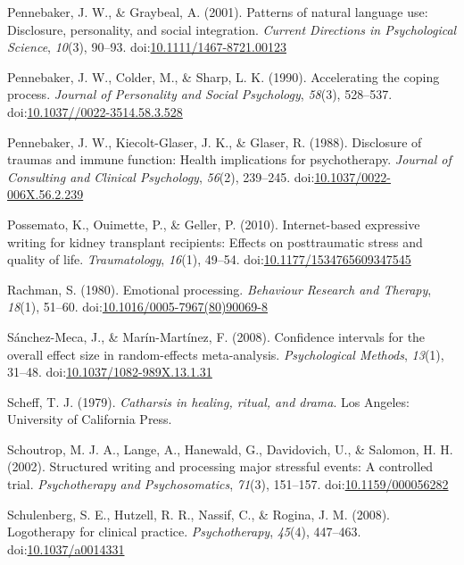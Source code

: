 \documentclass[english,man]{apa6}
\theoremstyle{definition}
\theoremstyle{definition}
\theoremstyle{definition}
\theoremstyle{remark}
\begin{document}
\hypertarget{ref-Pennebaker2001}{}
Pennebaker, J. W., \& Graybeal, A. (2001). Patterns of natural language
use: Disclosure, personality, and social integration. \emph{Current
Directions in Psychological Science}, \emph{10}(3), 90--93.
doi:\href{https://doi.org/10.1111/1467-8721.00123}{10.1111/1467-8721.00123}

\hypertarget{ref-Pennebaker1990}{}
Pennebaker, J. W., Colder, M., \& Sharp, L. K. (1990). Accelerating the
coping process. \emph{Journal of Personality and Social Psychology},
\emph{58}(3), 528--537.
doi:\href{https://doi.org/10.1037//0022-3514.58.3.528}{10.1037//0022-3514.58.3.528}

\hypertarget{ref-Pennebaker1988}{}
Pennebaker, J. W., Kiecolt-Glaser, J. K., \& Glaser, R. (1988).
Disclosure of traumas and immune function: Health implications for
psychotherapy. \emph{Journal of Consulting and Clinical Psychology},
\emph{56}(2), 239--245.
doi:\href{https://doi.org/10.1037/0022-006X.56.2.239}{10.1037/0022-006X.56.2.239}

\hypertarget{ref-Possemato2010}{}
Possemato, K., Ouimette, P., \& Geller, P. (2010). Internet-based
expressive writing for kidney transplant recipients: Effects on
posttraumatic stress and quality of life. \emph{Traumatology},
\emph{16}(1), 49--54.
doi:\href{https://doi.org/10.1177/1534765609347545}{10.1177/1534765609347545}

\hypertarget{ref-Rachman1980}{}
Rachman, S. (1980). Emotional processing. \emph{Behaviour Research and
Therapy}, \emph{18}(1), 51--60.
doi:\href{https://doi.org/10.1016/0005-7967(80)90069-8}{10.1016/0005-7967(80)90069-8}

\hypertarget{ref-Sanchez-Meca2008a}{}
Sánchez-Meca, J., \& Marín-Martínez, F. (2008). Confidence intervals for
the overall effect size in random-effects meta-analysis.
\emph{Psychological Methods}, \emph{13}(1), 31--48.
doi:\href{https://doi.org/10.1037/1082-989X.13.1.31}{10.1037/1082-989X.13.1.31}

\hypertarget{ref-Scheff1979}{}
Scheff, T. J. (1979). \emph{Catharsis in healing, ritual, and drama}.
Los Angeles: University of California Press.

\hypertarget{ref-Schoutrop2002}{}
Schoutrop, M. J. A., Lange, A., Hanewald, G., Davidovich, U., \&
Salomon, H. H. (2002). Structured writing and processing major stressful
events: A controlled trial. \emph{Psychotherapy and Psychosomatics},
\emph{71}(3), 151--157.
doi:\href{https://doi.org/10.1159/000056282}{10.1159/000056282}

\hypertarget{ref-Schulenberg2008}{}
Schulenberg, S. E., Hutzell, R. R., Nassif, C., \& Rogina, J. M. (2008).
Logotherapy for clinical practice. \emph{Psychotherapy}, \emph{45}(4),
447--463. doi:\href{https://doi.org/10.1037/a0014331}{10.1037/a0014331}
\end{document}
